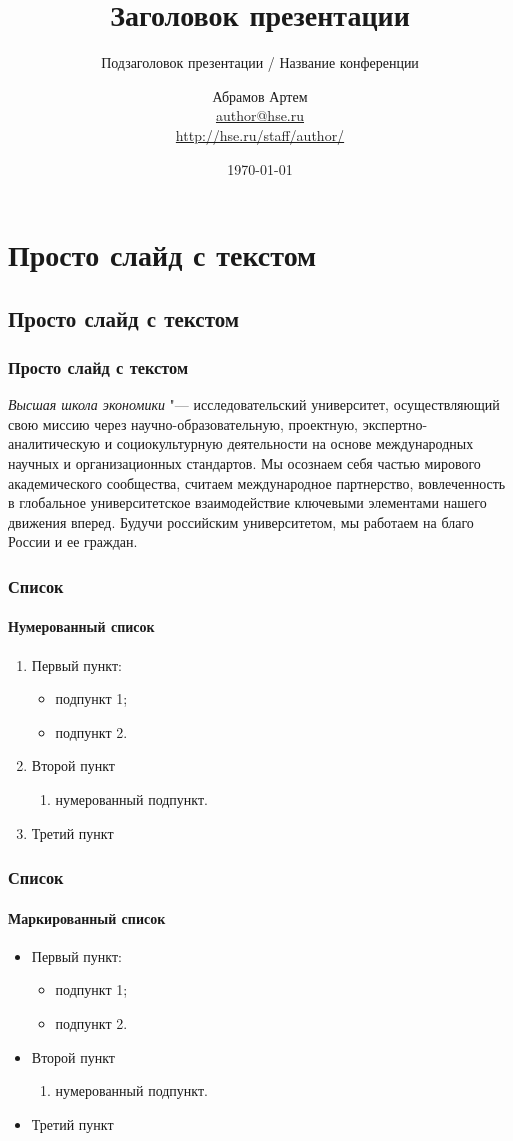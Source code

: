 \documentclass{beamer}
\title[Заголовок]{Заголовок презентации}
\subtitle{Подзаголовок презентации / Название конференции}
\author[Имя автораwwwwwwww]{Абрамов Артем \\ \smallskip \scriptsize \url{author@hse.ru}\\\url{http://hse.ru/staff/author/}}
\institute[Высшая школа экономики]{Национальный исследовательский университет \\ «Высшая школа экономики» (Москва)}
\date{\today}
\begin{document}

\frame[plain]{\titlepage}	%

\section{Просто слайд с текстом}
\subsection{Просто слайд с текстом}

\begin{frame}
\frametitle{Просто слайд с текстом}
	\emph{Высшая школа экономики} "--- исследовательский университет, осуществляющий свою миссию через научно-образовательную, проектную, экспертно-аналитическую и социокультурную деятельности на основе международных научных и организационных стандартов. Мы осознаем себя частью мирового академического сообщества, считаем международное партнерство, вовлеченность в глобальное университетское взаимодействие ключевыми элементами нашего движения вперед. Будучи российским университетом, мы работаем на благо России и ее граждан.
\end{frame}

\begin{frame}
\frametitle{Список}
\framesubtitle{Нумерованный список}
	\begin{enumerate} 
		\item Первый пункт:
		\begin{itemize}
			\item подпункт 1;
			\item подпункт 2.
		\end{itemize}
		\item Второй пункт
		\begin{enumerate}
			\item нумерованный подпункт.
		\end{enumerate} 
		\item Третий пункт
	\end{enumerate} 
\end{frame}

\begin{frame}
\frametitle{Список}
\framesubtitle{Маркированный список}
	\begin{itemize}
		\item Первый пункт:
		\begin{itemize}
			\item подпункт 1;
			\item подпункт 2.
		\end{itemize}
		\item Второй пункт
		\begin{enumerate}
			\item нумерованный подпункт.
		\end{enumerate}
		\item Третий пункт
	\end{itemize}
\end{frame}
\end{document}
